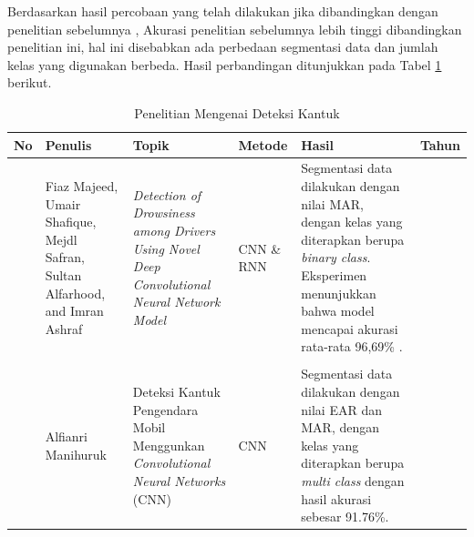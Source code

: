     
        
        
    Berdasarkan hasil percobaan yang telah dilakukan jika dibandingkan
     dengan penelitian sebelumnya \cite{majeed2023detection}, Akurasi
      penelitian sebelumnya lebih tinggi dibandingkan penelitian ini,
       hal ini disebabkan ada perbedaan segmentasi data dan jumlah 
       kelas yang digunakan berbeda. Hasil perbandingan 
        ditunjukkan pada Tabel \ref{Tabel Perbandingan Hasil} berikut. 


    \begin{table}[H]
        \centering
        \caption{Penelitian Mengenai Deteksi Kantuk}
         \label{Tabel Perbandingan Hasil}
        \begin{tabular}%
              {  >{\raggedright\arraybackslash}p{0.3cm} 
        >{\raggedright\arraybackslash}p{2.0cm} 
        >{\raggedright\arraybackslash}p{2.5cm} 
        >{\raggedright\arraybackslash}p{1.0cm} 
        >{\raggedright\arraybackslash}p{4.5cm} 
        >{\raggedright\arraybackslash}p{0.7cm}}
    
            \hline
            \textbf{No} & \textbf{Penulis} & \textbf{Topik} &\textbf{ Metode} & \textbf{Hasil} & \textbf{Tahun} \\
            
            \hline
             1 
            & 
              Fiaz Majeed, Umair Shafique, Mejdl Safran, Sultan Alfarhood, and Imran Ashraf
            &
            \textit{Detection of Drowsiness among Drivers Using Novel Deep Convolutional Neural Network Model}
            & 
            CNN \& RNN
            &
            
             Segmentasi data dilakukan dengan nilai MAR, dengan kelas yang diterapkan berupa \textit{binary class}. Eksperimen menunjukkan bahwa model mencapai akurasi rata-rata 96,69\% .
            &
            2023 \\   
            \\

            
            2 
            & 
             Alfianri Manihuruk
            & 
            Deteksi Kantuk Pengendara Mobil Menggunkan \textit{Convolutional Neural Networks} (CNN)

            & 
            CNN
            &
            Segmentasi data dilakukan dengan nilai EAR dan MAR, dengan kelas yang diterapkan berupa \textit{multi class} dengan hasil akurasi sebesar 91.76\%. 
            &
            2024 \\
       

             \hline

        \end{tabular}
    \end{table}


 
